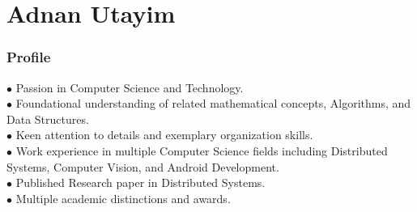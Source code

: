 \documentclass{tccv}
\begin{document}
\part{Adnan Utayim}

\section{Profile}
$\bullet$ Passion in Computer Science and Technology.\\
$\bullet$ Foundational understanding of related mathematical concepts, Algorithms, and Data Structures.\\
$\bullet$ Keen attention to details and exemplary organization skills.\\
$\bullet$ Work experience in multiple Computer Science fields including Distributed Systems, Computer Vision, and Android Development.\\
$\bullet$ Published Research paper in Distributed Systems.\\
$\bullet$ Multiple academic distinctions and awards.\\

\iffalse
$\bullet$ 5 years of academic programming experience. \\
$\bullet$ Team player with a passion to learn and contribute.\\
$\bullet$ Aptitude for solving challenging problems.\\
$\bullet$ Open to developmental feedback to help hone knowledge and skills. \\
\fi


    
\end{document}
